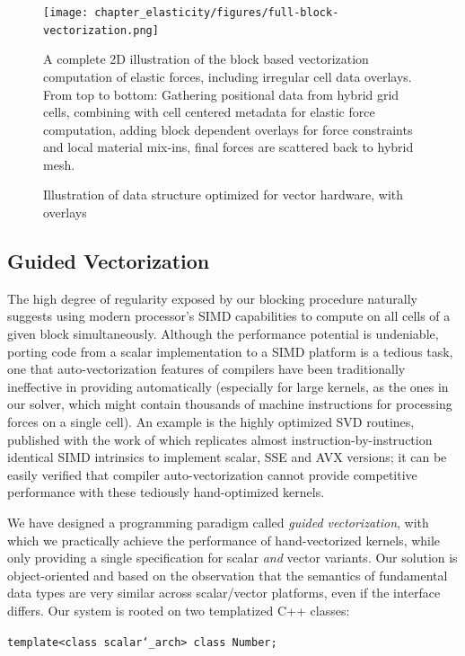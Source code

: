 \begin{figure}[t]
   \texttt{[image: chapter\_elasticity/figures/full-block-vectorization.png]}
 
   \caption{Illustration of data structure optimized for vector
     hardware, with overlays}{A complete 2D illustration of the block
     based vectorization computation of elastic forces, including
     irregular cell data overlays. From top to bottom: Gathering
     positional data from hybrid grid cells, combining with cell
     centered metadata for elastic force computation, adding block
     dependent overlays for force constraints and local material
     mix-ins, final forces are scattered back to hybrid mesh.}
   \label{fig:full-block-vectorization}
 
\end{figure}


\subsection{Guided Vectorization}

The high degree of regularity exposed by our blocking procedure
naturally suggests using modern processor's SIMD capabilities to
compute on all cells of a given block simultaneously. Although the
performance potential is undeniable, porting code from a scalar
implementation to a SIMD platform is a tedious task, one that
auto-vectorization features of compilers have been traditionally
ineffective in providing automatically (especially for
large kernels, as the ones in our solver, which might contain
thousands of machine instructions for processing forces on a
single cell). An example is the highly optimized SVD routines,
published with the work of \citet{McAdaZSETTS:2011} which replicates almost
instruction-by-instruction identical SIMD intrinsics to implement
scalar, SSE and AVX versions; it can be easily verified that
compiler auto-vectorization cannot provide competitive performance
with these tediously hand-optimized kernels.

We have designed a programming paradigm called \emph{guided
  vectorization}, with which we practically achieve the performance of
hand-vectorized kernels, while only providing a single specification
for scalar \emph{and} vector variants. Our solution is object-oriented
and based on the observation that the semantics of fundamental data
types are very similar across scalar/vector platforms, even if the
interface differs. Our system is rooted on two templatized C++
classes:
\begin{shaded}
\texttt{template<class scalar\char`_arch> class Number;}
\end{shaded}

